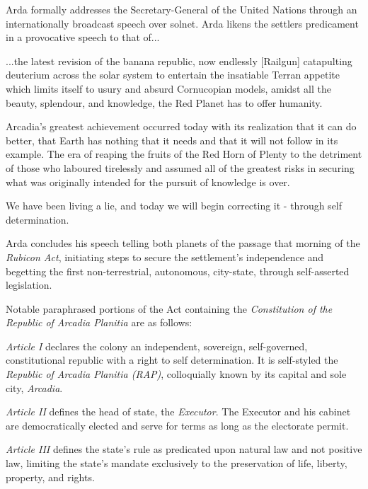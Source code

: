 Arda formally addresses the Secretary-General of the United Nations through an internationally broadcast speech over solnet. Arda likens the settlers predicament in a provocative speech to that of...
\crlf

\startTimelineDocument
...the latest revision of the banana republic, now endlessly [Railgun] catapulting deuterium across the solar system to entertain the insatiable Terran appetite which limits itself to usury and absurd Cornucopian models, amidst all the beauty, splendour, and knowledge, the Red Planet has to offer humanity.

Arcadia's greatest achievement occurred today with its realization that it can do better, that Earth has nothing that it needs and that it will not follow in its example. The era of reaping the fruits of the Red Horn of Plenty to the detriment of those who laboured tirelessly and assumed all of the greatest risks in securing what was originally intended for the pursuit of knowledge is over. 

We have been living a lie, and today we will begin correcting it - through self determination.
\stopTimelineDocument
\crlf

Arda concludes his speech telling both planets of the passage that morning of the {\it Rubicon Act}, initiating steps to secure the settlement's independence and begetting the first non-terrestrial, autonomous, city-state, through self-asserted legislation. 

Notable paraphrased portions of the Act containing the {\it Constitution of the Republic of Arcadia Planitia} are as follows:
\crlf

\startTimelineDocument
\startitemize[5]
\setupwhitespace[big]
\item {\it Article I} declares the colony an independent, sovereign, self-governed, constitutional republic with a right to self determination. It is self-styled the {\it Republic of Arcadia Planitia (RAP)}, colloquially known by its capital and sole city, {\it Arcadia}.

\item {\it Article II} defines the head of state, the {\it Executor}. The Executor and his cabinet are democratically elected and serve for terms as long as the electorate permit.

\item {\it Article III} defines the state's rule as predicated upon natural law and not positive law, limiting the state's mandate exclusively to the preservation of life, liberty, property, and rights.

